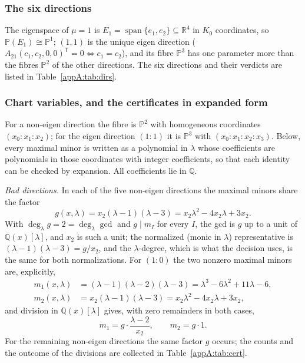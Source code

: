 \documentclass[journal]{IEEEtran}
\theoremstyle{plainn}
\theoremstyle{remark}
\begin{document}
\subsubsection{The six directions}


The eigenspace of $\mu=1$ is $E_1=\operatorname{span}\{e_1,e_2\}\subseteq\mathbb R^4$ in $K_0$
coordinates, so $\mathbb P(E_1)\cong\mathbb P^1$; $(1,1)$ is the unique eigen direction
($A_{21}(c_1,c_2,0,0)^{\mathsf T}=0\iff c_1=c_2$), and its fibre $\mathbb P^3$ has one parameter more
than the fibres $\mathbb P^2$ of the other directions. The six directions and their verdicts are listed
in Table~\ref{appA:tab:dirs}.


\subsubsection{Chart variables, and the certificates in expanded form}


For a non-eigen direction the fibre is $\mathbb P^2$ with homogeneous coordinates $(x_0\!:\!x_1\!:\!x_2)$;
for the eigen direction $(1\!:\!1)$ it is $\mathbb P^3$ with $(x_0\!:\!x_1\!:\!x_2\!:\!x_3)$. Below,
every maximal minor is written as a polynomial in $\lambda$ whose coefficients are polynomials in those
coordinates with integer coefficients, so that each identity can be checked by expansion. All
coefficients lie in $\mathbb Q$.

\emph{Bad directions.} In each of the five non-eigen directions the maximal minors share the factor
\begin{equation}\label{appA:eq:g}
g(x,\lambda)=x_2(\lambda-1)(\lambda-3)=x_2\lambda^2-4x_2\lambda+3x_2 .
\end{equation}
With $\deg_\lambda g=2=\deg_\lambda\gcd$ and $g\mid m_I$ for every $I$, the gcd is $g$ up to a unit of
$\mathbb Q(x)[\lambda]$, and $x_2$ is such a unit; the normalized (monic in $\lambda$) representative is
$(\lambda-1)(\lambda-3)=g/x_2$, and the $\lambda$-degree, which is what the decision uses, is the same for
both normalizations.
For $(1\!:\!0)$ the two nonzero maximal minors are, explicitly,
\begin{align}
m_1(x,\lambda)&=(\lambda-1)(\lambda-2)(\lambda-3)=\lambda^3-6\lambda^2+11\lambda-6,
\label{appA:eq:m1}\\
m_2(x,\lambda)&=x_2(\lambda-1)(\lambda-3)=x_2\lambda^2-4x_2\lambda+3x_2,
\label{appA:eq:m2}
\end{align}
and division in $\mathbb Q(x)[\lambda]$ gives, with zero remainders in both cases,
\begin{equation}\label{appA:eq:divcert}
m_1=g\cdot\frac{\lambda-2}{x_2},\qquad m_2=g\cdot 1 .
\end{equation}
For the remaining non-eigen directions the same factor $g$ occurs; the counts and the outcome of the
divisions are collected in Table~\ref{appA:tab:cert}.
\end{document}
